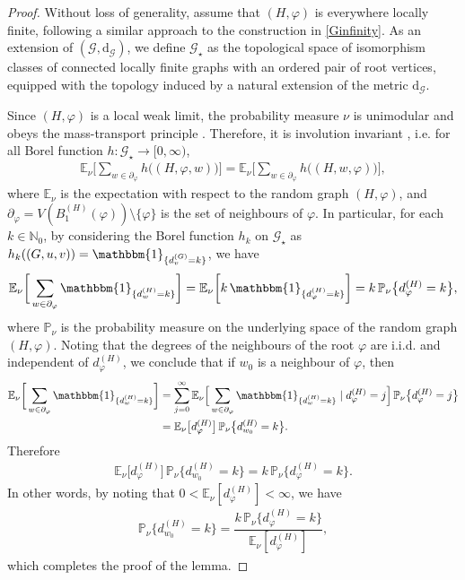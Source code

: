 \documentclass[11pt]{article}
\numberwithin{equation}{section}
\theoremstyle{plain}
\newcommand{\N}{\mathbb N}
\newcommand{\E}{\mathbb E}
\renewcommand{\P}{\mathbb P}
\begin{document}
\begin{proof}
Without loss of generality, assume that $(H, \varphi)$ is everywhere locally finite, following a similar approach to the construction in \eqref{Ginfinity}. As an extension of $(\mathscr{G}, \mathrm{d}_{\mathscr{G}})$, we define $\mathscr{G}_{\star}$ as the topological space of isomorphism classes of connected locally finite graphs with an ordered pair of root vertices, equipped with the topology induced by a natural extension of the metric $\mathrm{d}_{\mathscr{G}}$. 

Since $(H, \varphi)$ is a local weak limit, the probability measure $\nu$ is unimodular and obeys
the mass-transport principle \cite[Section 3.2]{BS}. Therefore, it is involution invariant \cite[Propositon 2.2]{AL}, i.e. for all Borel function $h:\mathscr{G}_{\star}\to [0,\infty)$,
\begin{align*}
\E_{\nu}\bigg[\sum_{w\in \partial_{\varphi}} h\big((H, \varphi ,w)\big)\bigg]=\E_{\nu}\bigg[\sum_{w\in\partial_{\varphi}} h\big((H, w,\varphi)\big)\bigg],
\end{align*}
where $\E_{\nu}$ is the expectation with respect to the random graph $(H, \varphi)$, and $\partial_{\varphi}=V(B_{1}^{(H)}(\varphi))\setminus\{\varphi\}$ is the set of neighbours of $\varphi$. In particular, for each $k\in\N_{0}$, by considering the Borel function $h_{k}$ on $\mathscr{G}_{\star}$ as $h_{k}((G,u,v))=\mathbbm{1}_{\{d_{v}^{(G)}=k\}}$, we have
\begin{align*}
\E_{\nu}\bigg[\sum_{w\in \partial_{\varphi}} \mathbbm{1}_{\{d_{w}^{(H)}=k\}}\bigg]=\E_{\nu}\bigg[k\,\mathbbm{1}_{\{d_{\varphi}^{(H)}=k\}}\bigg]=k\,\P_{\nu}\big\{d_{\varphi}^{(H)}=k\big\},
\end{align*}
where $\P_{\nu}$ is the probability measure on the underlying space of the random graph $(H, \varphi)$. Noting that the degrees of the neighbours of the root $\varphi$ are i.i.d. and independent of $d_{\varphi}^{(H)}$, we conclude that if $w_{0}$ is a neighbour of $\varphi$, then
\begin{align*}
\E_{\nu}\bigg[\sum_{w\in \partial_{\varphi}} \mathbbm{1}_{\{d_{w}^{(H)}=k\}}\bigg]
&=\sum_{j=0}^{\infty}\E_{\nu}\Big[\sum_{w\in \partial_{\varphi}} \mathbbm{1}_{\{d_{w}^{(H)}=k\}}\mid d_{\varphi}^{(H)}=j \Big]\,\P_{\nu}\big\{d_{\varphi}^{(H)}=j\big\}
\\&=\E_{\nu}\big[d_{\varphi}^{(H)}\big]\,\P_{\nu}\big\{d_{w_{0}}^{(H)}=k\big\}.
\end{align*}
Therefore
\begin{align*}
\E_{\nu}\big[d_{\varphi}^{(H)}\big]\,\P_{\nu}\big\{d_{w_{0}}^{(H)}=k\big\}=k\,\P_{\nu}\big\{d_{\varphi}^{(H)}=k\big\}.
\end{align*}
In other words, by noting that $0<\E_{\nu}[d_{\varphi}^{(H)}]<\infty$, we have
\begin{align*}
\P_{\nu}\big\{d_{w_{0}}^{(H)}=k\big\}=\dfrac{k\,\P_{\nu}\big\{d_{\varphi}^{(H)}=k\big\}}{\E_{\nu}[d_{\varphi}^{(H)}]},
\end{align*}
which completes the proof of the lemma.
\end{proof}
\end{document}
